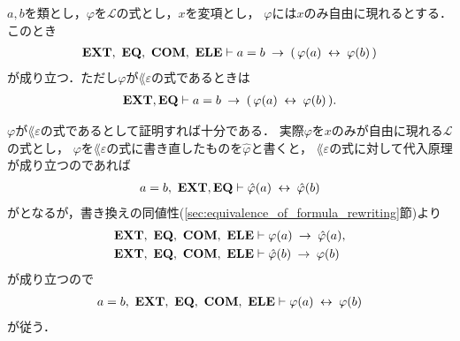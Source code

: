 	\begin{screen}
		\begin{thm}[代入原理]\label{thm:the_principle_of_substitution}
			$a,b$を類とし，$\varphi$を$\mathcal{L}$の式とし，$x$を変項とし，
			$\varphi$には$x$のみ自由に現れるとする．このとき
			\begin{align}
				\mbox{{\bf EXT}},\ \mbox{{\bf EQ}},\ \mbox{\bf COM},\ \mbox{{\bf ELE}} \vdash a = b \hspace{0.25em}\rightarrow\hspace{0.25em} 
				(\, \varphi(a) \hspace{0.25em}\leftrightarrow\hspace{0.25em} \varphi(b)\, )
			\end{align}
			が成り立つ．ただし$\varphi$が$\lang{\varepsilon}$の式であるときは
			\begin{align}
				\mbox{{\bf EXT}},\mbox{{\bf EQ}} \vdash a = b \hspace{0.25em}\rightarrow\hspace{0.25em} 
				(\, \varphi(a) \hspace{0.25em}\leftrightarrow\hspace{0.25em} \varphi(b)\, ).
			\end{align}
		\end{thm}
	\end{screen}
	
	$\varphi$が$\lang{\varepsilon}$の式であるとして証明すれば十分である．
	実際$\varphi$を$x$のみが自由に現れる$\mathcal{L}$の式とし，
	$\varphi$を$\lang{\varepsilon}$の式に書き直したものを$\hat{\varphi}$と書くと，
	$\lang{\varepsilon}$の式に対して代入原理が成り立つのであれば
	\begin{align}
		a = b,\ \mbox{{\bf EXT}},\mbox{{\bf EQ}} \vdash \hat{\varphi}(a) \hspace{0.25em}\leftrightarrow\hspace{0.25em} \hat{\varphi}(b)
	\end{align}
	がとなるが，書き換えの同値性(\ref{sec:equivalence_of_formula_rewriting}節)より
	\begin{align}
		\mbox{{\bf EXT}},\ \mbox{{\bf EQ}},\ \mbox{\bf COM},\ \mbox{{\bf ELE}} &\vdash \varphi(a) \hspace{0.25em}\rightarrow\hspace{0.25em} \hat{\varphi}(a), \\
		\mbox{{\bf EXT}},\ \mbox{{\bf EQ}},\ \mbox{\bf COM},\ \mbox{{\bf ELE}} &\vdash \hat{\varphi}(b) \hspace{0.25em}\rightarrow\hspace{0.25em} \varphi(b)
	\end{align}
	が成り立つので
	\begin{align}
		a = b,\ \mbox{{\bf EXT}},\ \mbox{{\bf EQ}},\ \mbox{\bf COM},\ \mbox{{\bf ELE}} \vdash \varphi(a) \hspace{0.25em}\leftrightarrow\hspace{0.25em} \varphi(b)
	\end{align}
	が従う．
	
